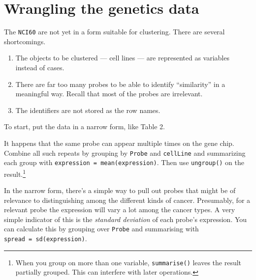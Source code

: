 \documentclass[]{tufte-handout}
\providecommand{\tightlist}{%
  \setlength{\itemsep}{0pt}\setlength{\parskip}{0pt}}
\begin{document}
\section{Wrangling the genetics data}\label{wrangling-the-genetics-data}

The \texttt{NCI60} are not yet in a form suitable for clustering. There
are several shortcomings.

\begin{enumerate}
\def\labelenumi{\arabic{enumi}.}
\tightlist
\item
  The objects to be clustered --- cell lines --- are represented as
  variables instead of cases.
\item
  There are far too many probes to be able to identify ``similarity'' in
  a meaningful way. Recall that most of the probes are irrelevant.
\item
  The identifiers are not stored as the row names.
\end{enumerate}

To start, put the data in a narrow form, like Table 2.


It happens that the same probe can appear multiple times on the gene
chip. Combine all such repeats by grouping by \texttt{Probe} and
\texttt{cellLine} and summarizing each group with
\texttt{expression\ =\ mean(expression)}. Then use \texttt{ungroup()} on
the result.\footnote{When you group on more than one variable,
  \texttt{summarise()} leaves the result partially grouped. This can
  interfere with later operations.}

In the narrow form, there's a simple way to pull out probes that might
be of relevance to distinguishing among the different kinds of cancer.
Presumably, for a relevant probe the expression will vary a lot among
the cancer types. A very simple indicator of this is the \emph{standard
deviation} of each probe's expression. You can calculate this by
grouping over \texttt{Probe} and summarising with
\texttt{spread\ =\ sd(expression)}.
\end{document}
